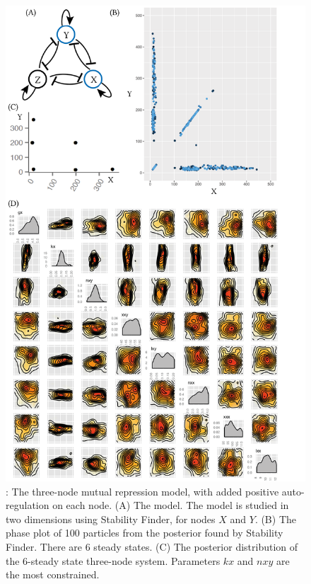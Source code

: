 \begin{figure}[h]
\begin{center}
\includegraphics[scale=0.6]{../../chapters/chapterStabilityFinder/images/lu_6ss.png}
\caption[LoF caption]{ \label{fig:fig8}: The three-node mutual repression model, with added positive auto-regulation on each node. (A) The model. The model is studied in two dimensions using Stability Finder, for nodes $X$ and $Y$. (B) The phase plot of 100 particles from the posterior found by Stability Finder. There are 6 steady states. (C) The posterior distribution of the 6-steady state three-node system. Parameters $kx$ and $nxy$ are the most constrained.}
\end{center}
\end{figure}
\clearpage

